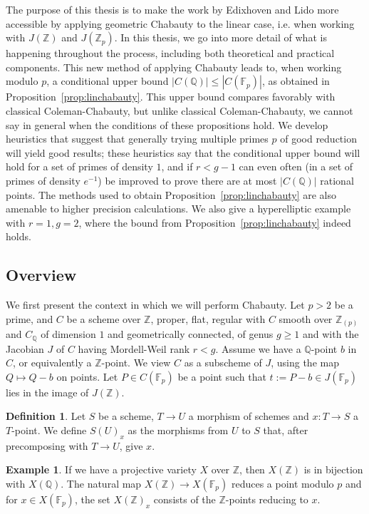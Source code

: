 \documentclass[12pt]{article}
\newcommand{\Z}{\mathbb{Z}}
\newcommand{\Q}{\mathbb{Q}}
\newcommand{\F}{\mathbb{F}}
\theoremstyle{plain}
\theoremstyle{definition}
\newtheorem{defn}[thm]{Definition} %
\newtheorem{exmp}[thm]{Example} %
\theoremstyle{remark}
\begin{document}
The purpose of this thesis is to make the work by Edixhoven and Lido more accessible by applying geometric Chabauty to the linear case, i.e. when working with $J(\Z)$ and $J(\Z_p)$. In this thesis, we go into more detail of what is happening throughout the process, including both theoretical and practical components. This new method of applying Chabauty leads to, when working modulo $p$, a conditional upper bound $|C(\Q)| \leq |C(\F_p)|$, as obtained in Proposition~\ref{prop:linchabauty}. This upper bound compares favorably with classical Coleman-Chabauty, but unlike classical Coleman-Chabauty, we cannot say in general when the conditions of these propositions hold. We develop heuristics that suggest that generally trying multiple primes $p$ of good reduction will yield good results; these heuristics say that the conditional upper bound will hold for a set of primes of density $1$, and if $r < g-1$ can even often (in a set of primes of density $e^{-1}$) be improved to prove there are at most $|C(\Q)|$ rational points. The methods used to obtain Proposition~\ref{prop:linchabauty} are also amenable to higher precision calculations. We also give a hyperelliptic example with $r = 1, g = 2$, where the bound from Proposition~\ref{prop:linchabauty} indeed holds. 

\subsection{Overview}
We first present the context in which we will perform Chabauty. Let $p>2$ be a prime, and $C$ be a scheme over $\Z$, proper, flat, regular with $C$ smooth over $\Z_{(p)}$ and $C_\Q$ of dimension $1$ and geometrically connected, of genus $g \geq 1$ and with the Jacobian $J$ of $C$ having Mordell-Weil rank $r < g$. Assume we have a $\Q$-point $b$ in $C$, or equivalently a $\Z$-point. We view $C$ as a subscheme of $J$, using the map $Q \mapsto Q - b$ on points. Let $P \in C(\F_p)$ be a point such that $t := P - b \in J(\F_p)$ lies in the image of $J(\Z)$.

\begin{defn}
Let $S$ be a scheme, $T \to U$ a morphism of schemes and $x : T \to S$ a $T$-point. We define $S(U)_x$ as the morphisms from $U$ to $S$ that, after precomposing with $T \to U$, give $x$.
\end{defn}
\begin{exmp}
If we have a projective variety $X$ over $\Z$, then $X(\Z)$ is in bijection with $X(\Q)$. The natural map $X(\Z) \to X(\F_p)$ reduces a point modulo $p$ and for $x \in X(\F_p)$, the set $X(\Z)_x$ consists of the $\Z$-points reducing to $x$.
\end{exmp}
\end{document}
